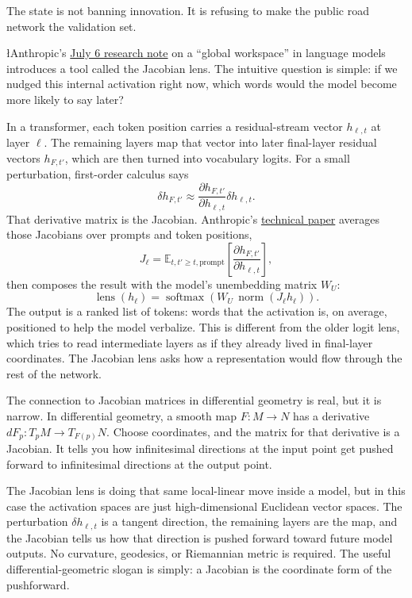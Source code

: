 \documentclass{news}
\begin{document}
The state is not banning innovation. It is refusing to make the public road network the validation set.

{\l{A}nthropic's \href{https://www.anthropic.com/research/global-workspace}{July 6 research note} on a ``global workspace'' in language models introduces a tool called the Jacobian lens. The intuitive question is simple: if we nudged this internal activation right now, which words would the model become more likely to say later?
\par}

In a transformer, each token position carries a residual-stream vector \(h_{\ell,t}\) at layer \(\ell\). The remaining layers map that vector into later final-layer residual vectors \(h_{F,t'}\), which are then turned into vocabulary logits. For a small perturbation, first-order calculus says
\[
\delta h_{F,t'} \approx
\frac{\partial h_{F,t'}}{\partial h_{\ell,t}}
\delta h_{\ell,t}.
\]
That derivative matrix is the Jacobian. Anthropic's \href{https://transformer-circuits.pub/2026/workspace/index.html}{technical paper} averages those Jacobians over prompts and token positions,
\[
J_\ell =
\mathbb{E}_{t,t' \geq t,\mathrm{prompt}}
\left[
\frac{\partial h_{F,t'}}{\partial h_{\ell,t}}
\right],
\]
then composes the result with the model's unembedding matrix \(W_U\):
\[
\operatorname{lens}(h_\ell)=
\operatorname{softmax}(W_U\,\operatorname{norm}(J_\ell h_\ell)).
\]
The output is a ranked list of tokens: words that the activation is, on average, positioned to help the model verbalize. This is different from the older logit lens, which tries to read intermediate layers as if they already lived in final-layer coordinates. The Jacobian lens asks how a representation would flow through the rest of the network.

The connection to Jacobian matrices in differential geometry is real, but it is narrow. In differential geometry, a smooth map \(F:M\to N\) has a derivative \(dF_p:T_pM\to T_{F(p)}N\). Choose coordinates, and the matrix for that derivative is a Jacobian. It tells you how infinitesimal directions at the input point get pushed forward to infinitesimal directions at the output point.

The Jacobian lens is doing that same local-linear move inside a model, but in this case the activation spaces are just high-dimensional Euclidean vector spaces. The perturbation \(\delta h_{\ell,t}\) is a tangent direction, the remaining layers are the map, and the Jacobian tells us how that direction is pushed forward toward future model outputs. No curvature, geodesics, or Riemannian metric is required. The useful differential-geometric slogan is simply: a Jacobian is the coordinate form of the pushforward.
\end{document}
